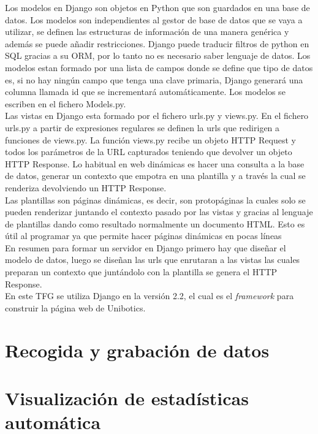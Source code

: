 Los modelos en Django son objetos en Python que son guardados en una base de datos. Los modelos son independientes al gestor de base de datos que se vaya a utilizar, se definen las estructuras de información de una manera genérica y además se puede añadir restricciones. Django puede traducir filtros de python en SQL gracias a su ORM, por lo tanto no es necesario saber lenguaje de datos. Los modelos estan formado por una lista de campos donde se define que tipo de datos es, si no hay ningún campo que tenga una clave primaria, Django generará una columna llamada id que se incrementará automáticamente. Los modelos se escriben en el fichero Models.py.\cite{model}\\

Las vistas en Django esta formado por el fichero urls.py y views.py. En el fichero urls.py a partir de expresiones regulares se definen la urls que redirigen a funciones de views.py. La función views.py recibe un objeto HTTP Request y todos los parámetros de la URL capturados teniendo que devolver un objeto HTTP Response. Lo habitual en web dinámicas es hacer una consulta a la base de datos, generar un contexto que empotra en una plantilla y a través la cual se renderiza devolviendo un HTTP Response.\\

Las plantillas son páginas dinámicas, es decir, son protopáginas la cuales solo se pueden renderizar juntando el contexto pasado por las vistas y gracias al lenguaje de plantillas dando como resultado normalmente un documento HTML. Esto es útil al programar ya que permite hacer páginas dinámicas en pocas líneas\\
\newpage
En resumen para formar un servidor en Django primero hay que diseñar el modelo de datos, luego se diseñan las urls que enrutaran a las vistas las cuales preparan un contexto que juntándolo con la plantilla se genera el HTTP Response.\\

En este TFG se utiliza Django en la versión 2.2, el cual es el\textit{ framework} para construir la página web de Unibotics.













\section{Recogida y grabación de datos}
\section{Visualización de estadísticas automática}